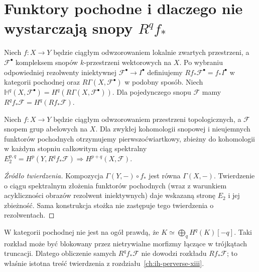 \section{Funktory pochodne i dlaczego nie wystarczają snopy \texorpdfstring{$R^qf_*$}{Rq f*}}
\begin{definicja}
Niech $f:X\to Y$ będzie ciągłym odwzorowaniem
lokalnie zwartych przestrzeni, a $\mathcal F^\bullet$
kompleksem snopów $k$-przestrzeni wektorowych na $X$.
Po wybraniu odpowiedniej rezolwenty iniektywnej
$\mathcal F^\bullet\to I^\bullet$ definiujemy
$Rf_*\mathcal F^\bullet=f_*I^\bullet$ w kategorii pochodnej
oraz $R\Gamma(X,\mathcal F^\bullet)$ w podobny sposób.
Niech $\mathbb H^q(X,\mathcal F^\bullet)=
H^q(R\Gamma(X,\mathcal F^\bullet))$.
Dla pojedynczego snopu $\mathcal F$ mamy
$R^qf_*\mathcal F=H^q(Rf_*\mathcal F)$.
\end{definicja}
\begin{twierdzenie}
\label{thm:leray-derived-xiv}
Niech $f:X\to Y$ będzie ciągłym odwzorowaniem
przestrzeni topologicznych, a $\mathcal F$ snopem grup
abelowych na $X$. Dla zwykłej kohomologii snopowej
i nieujemnych funktorów pochodnych otrzymujemy
pierwszoćwiartkowy, zbieżny do kohomologii w każdym
stopniu całkowitym ciąg spektralny
$E_2^{p,q}=H^p(Y,R^qf_*\mathcal F)
\Rightarrow H^{p+q}(X,\mathcal F)$.
\end{twierdzenie}
\begin{proof}[Źródło twierdzenia]
Kompozycja $\Gamma(Y,-)\circ f_*$ jest równa
$\Gamma(X,-)$. Twierdzenie o ciągu spektralnym
złożenia funktorów pochodnych (wraz z warunkiem
acykliczności obrazów rezolwent iniektywnych)
daje wskazaną stronę $E_2$ i jej zbieżność.
Sama konstrukcja stożka nie zastępuje tego
twierdzenia o rezolwentach.
\end{proof}
\begin{uwaga}
W kategorii pochodnej nie jest na ogół prawdą, że
$K\simeq\bigoplus_qH^q(K)[-q]$.
Taki rozkład może być blokowany przez nietrywialne
morfizmy łączące w trójkątach truncacji.
Dlatego obliczenie samych $R^qf_*\mathcal F$ nie dowodzi
rozkładu $Rf_*\mathcal F$; to właśnie istotna treść
twierdzenia z rozdziału~\ref{ch:ih-perverse-xiii}.
\end{uwaga}

